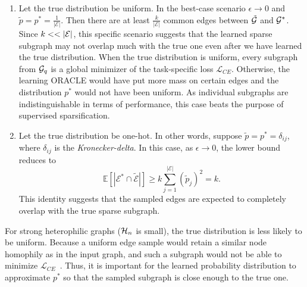 \begin{enumerate}[wide, labelwidth=!, labelindent=2pt,itemsep=1pt,topsep=1pt]
    \item Let the true distribution be uniform. In the best-case scenario $\epsilon \rightarrow 0$ and $\tilde{p} = p^* = \frac{1}{|\mathcal{E}|}$. Then there are at least $\frac{k}{|\mathcal{E}|}$ common edges between $\tilde{{\mathcal{G}}}$ and ${\mathcal{G}}^*$. 
    Since $k << \lvert\mathcal{E}\rvert$, this specific scenario suggests that the learned sparse subgraph may not overlap much with the true one even after we have learned the true distribution. When the true distribution is uniform, every subgraph from ${\mathcal{G}}_q$ is a global minimizer of the task-specific loss $\mathcal{L}_{CE}$. Otherwise, the learning ORACLE would have put more mass on certain edges and the distribution $p^*$ would not have been uniform. As individual subgraphs are indistinguishable in terms of performance, this case beats the purpose of supervised sparsification.

    \item Let the true distribution be one-hot. In other words, suppose $\tilde{p} = p^* = \delta_{ij}$, where $\delta_{ij}$ is the \emph{Kronecker-delta}. In this case, as $\epsilon \rightarrow 0$, the lower bound reduces to 
    \vspace{-8pt}
    \begin{equation*}
    \mathbb{E}[|\mathcal{E}^* \cap \mathcal{\tilde{E}}|] \geq k \sum_{j=1}^{|\mathcal{E}|} (\tilde{p}_j)^2 = k.
    \end{equation*}
    This identity suggests that the sampled edges are expected to completely overlap with the true sparse subgraph. 
    
\end{enumerate}

For strong heterophilic graphs (${\mathcal{H}}_n$ is small), the true distribution is less likely to be uniform. Because a uniform edge sample would retain a similar node homophily as in the input graph, and such a subgraph would not be able to minimize $\mathcal{L}_{CE}$~\cite{das2024ags}. Thus, it is important for the learned probability distribution to approximate $p^*$ so that the sampled subgraph is close enough to the true one.
 
